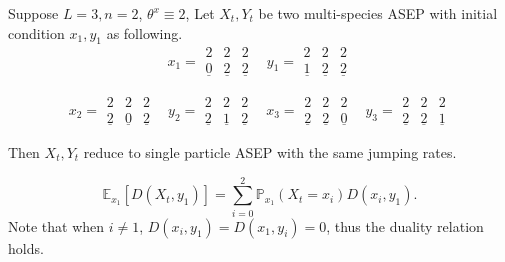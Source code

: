 \documentclass{ximera}
\begin{document}
\begin{example}



Suppose $L=3,n=2$, $\theta^x\equiv 2$, Let $X_t,Y_t$ be two multi-species ASEP with initial condition $x_1,y_1$ as 
following.
\begin{equation*}
 x_1=    \begin{matrix}
    2 & 2 & 2\\
   \underline{0}  & \underline{2} &\underline{2}
    \end{matrix}
\ \ \ \     y_1=    \begin{matrix}
    2 & 2 & 2\\
   \underline{1}  & \underline{2} &\underline{2}
    \end{matrix}
\end{equation*}


\begin{equation*}
 x_2=    \begin{matrix}
    2 & 2 & 2\\
   \underline{2}  & \underline{0} &\underline{2}
    \end{matrix}
\ \ \ \     y_2=    \begin{matrix}
    2 & 2 & 2\\
   \underline{2}  & \underline{1} &\underline{2}
    \end{matrix}
\ \ \ \        x_3=    \begin{matrix}
    2 & 2 & 2\\
   \underline{2}  & \underline{2} &\underline{0}
    \end{matrix}
\ \ \ \     y_3=    \begin{matrix}
    2 & 2 & 2\\
   \underline{2}  & \underline{2} &\underline{1}
    \end{matrix}
\end{equation*}





Then $X_t,Y_t$ reduce to single particle ASEP with the same jumping rates. 

\begin{equation*}
    \mathbb{E}_{x_1}[D(X_t,y_1)]=\sum_{i=0}^2 \mathbb{P}_{x_1}(X_t=x_i)D(x_i,y_1).
\end{equation*}
Note  that  when $i\neq 1$, $D(x_i,y_1)=D(x_1,y_i)=0$, thus the duality relation holds.
\end{example}
\end{document}
